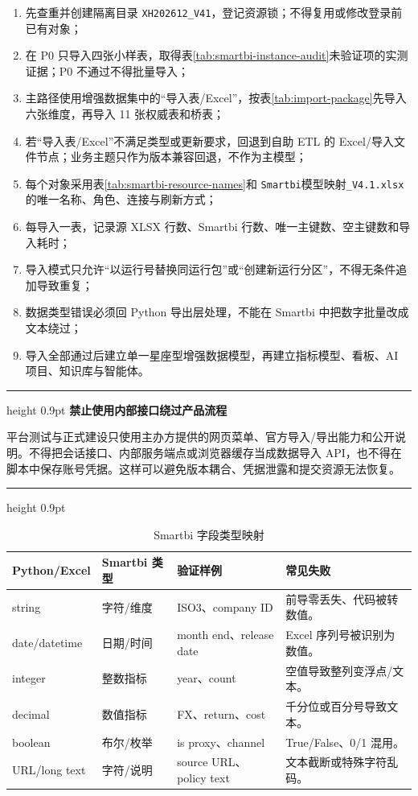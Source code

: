 \documentclass[UTF8,fontset=windows,12pt,openany]{ctexbook}
\newenvironment{warningbox}[1][]{%
  \par\medskip\noindent\begin{center}\begin{minipage}{0.93\textwidth}%
  \color{TextGray}\hrule height 0.9pt\vspace{0.45em}%
  \textbf{#1}\par\smallskip\color{black}%
}{%
  \par\vspace{0.35em}\color{TextGray}\hrule height 0.9pt%
  \end{minipage}\end{center}\medskip%
}
\newcommand{\Field}[1]{{\small\nolinkurl{#1}}}
\newcommand{\File}[1]{{\small\begingroup\urlstyle{same}\nolinkurl{#1}\endgroup}}
\begin{document}
\begin{enumerate}
  \item 先查重并创建隔离目录 \Field{XH202612_V41}，登记资源锁；不得复用或修改登录前已有对象；
  \item 在 P0 只导入四张小样表，取得表\ref{tab:smartbi-instance-audit}未验证项的实测证据；P0 不通过不得批量导入；
  \item 主路径使用增强数据集中的“导入表/Excel”，按表\ref{tab:import-package}先导入六张维度，再导入 11 张权威表和桥表；
  \item 若“导入表/Excel”不满足类型或更新要求，回退到自助 ETL 的 Excel/导入文件节点；业务主题只作为版本兼容回退，不作为主模型；
  \item 每个对象采用表\ref{tab:smartbi-resource-names}和 \File{Smartbi}\textsf{模型映射}\File{_V4.1.xlsx}的唯一名称、角色、连接与刷新方式；
  \item 每导入一表，记录源 XLSX 行数、Smartbi 行数、唯一主键数、空主键数和导入耗时；
  \item 导入模式只允许“以运行号替换同运行包”或“创建新运行分区”，不得无条件追加导致重复；
  \item 数据类型错误必须回 Python 导出层处理，不能在 Smartbi 中把数字批量改成文本绕过；
  \item 导入全部通过后建立单一星座型增强数据模型，再建立指标模型、看板、AI 项目、知识库与智能体。
\end{enumerate}

\begin{warningbox}[禁止使用内部接口绕过产品流程]
平台测试与正式建设只使用主办方提供的网页菜单、官方导入/导出能力和公开说明。不得把会话接口、内部服务端点或浏览器缓存当成数据导入 API，也不得在脚本中保存账号凭据。这样可以避免版本耦合、凭据泄露和提交资源无法恢复。
\end{warningbox}

\begin{longtable}{p{3.3cm}p{3.6cm}p{3.2cm}p{3.7cm}}
\caption{Smartbi 字段类型映射}\label{tab:smartbi-types}\\
\toprule
\textbf{Python/Excel} & \textbf{Smartbi 类型} & \textbf{验证样例} & \textbf{常见失败}\\
\midrule
string & 字符/维度 & ISO3、company ID & 前导零丢失、代码被转数值。\\
date/datetime & 日期/时间 & month end、release date & Excel 序列号被识别为数值。\\
integer & 整数指标 & year、count & 空值导致整列变浮点/文本。\\
decimal & 数值指标 & FX、return、cost & 千分位或百分号导致文本。\\
boolean & 布尔/枚举 & is proxy、channel & True/False、0/1 混用。\\
URL/long text & 字符/说明 & source URL、policy text & 文本截断或特殊字符乱码。\\
\bottomrule
\end{longtable}
\end{document}
